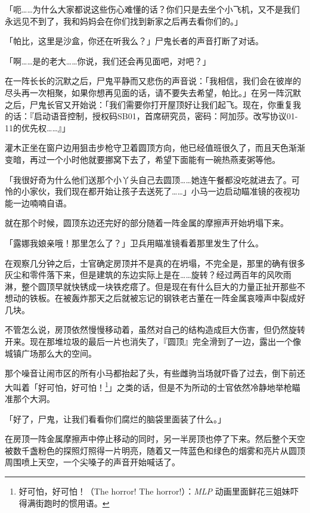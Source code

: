 「呃……为什么大家都说这些伤心难懂的话？你们只是去坐个小飞机，又不是我们永远见不到了，我和妈妈会在你们找到新家之后再去看你们的。」

「帕比，这里是沙盒，你还在听我么？」尸鬼长者的声音打断了对话。

「啊……是的老大……你说，我们还会再见面吧，对吧？」

在一阵长长的沉默之后，尸鬼平静而又悲伤的声音说：「我相信，我们会在彼岸的尽头再一次相聚，如果你想再见面的话，请不要失去希望，帕比。」在另一阵沉默之后，尸鬼长官又开始说：「我们需要你打开屋顶好让我们起飞。现在，你重复我的话：『启动语音控制，授权码SB01，首席研究员，密码：阿加莎。改写协议01-11的优先权……』」

\horizonline


灌木正坐在窗户边用狙击步枪守卫着圆顶方向，他已经值班很久了，而且天色渐渐变暗，再过一个小时他就要挪窝下去了，希望下面能有一碗热燕麦粥等他。

「我很好奇为什么他们送那个小丫头自己去圆顶……她连午餐都没吃就进去了。可怜的小家伙，我们现在都开始让孩子去送死了……」小马一边启动瞄准镜的夜视功能一边喃喃自语。

就在那个时候，圆顶东边还完好的部分随着一阵金属的摩擦声开始坍塌下来。

「露娜我娘亲哦！那里怎么了？」卫兵用瞄准镜看着那里发生了什么。

在观察几分钟之后，士官确定房顶并不是真的在坍塌，不完全是，那里的确有很多灰尘和零件落下来，但是建筑的东边实际上是在……旋转？经过两百年的风吹雨淋，整个圆顶早就快锈成一块铁疙瘩了。但是现在有什么巨大的力量正扯开那些不想动的铁板。在被轰炸那天之后就被忘记的钢铁老古董在一阵金属哀嚎声中裂成好几块。

不管怎么说，房顶依然慢慢移动着，虽然对自己的结构造成巨大伤害，但仍然旋转开来。现在那堆垃圾的最后一片也消失了，『圆顶』完全滑到了一边，露出一个像城镇广场那么大的空间。

那个噪音让闹市区的所有小马都抬起了头，有些雌驹当场就吓昏了过去，倒下前还大叫着「好可怕，好可怕！\footnote{好可怕，好可怕！（The horror! The horror!）：\emph{MLP} 动画里面鲜花三姐妹吓得满街跑时的惯用语。}」之类的话，但是不为所动的士官依然冷静地举枪瞄准那个大洞。

「好了，尸鬼，让我们看看你们腐烂的脑袋里面装了什么。」

在房顶一阵金属摩擦声中停止移动的同时，另一半房顶也停了下来。然后整个天空被数千盏粉色的探照灯照得一片明亮，随着又一阵蓝色和绿色的烟雾和亮片从圆顶周围喷上天空，一个尖嗓子的声音开始喊话了。

